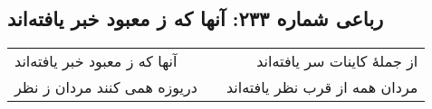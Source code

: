 \begin{center}
\section*{رباعی شماره ۲۳۳: آنها که ز معبود خبر یافته‌اند}
\label{sec:sh233}
\begin{longtable}{l p{0.5cm} r}
آنها که ز معبود خبر یافته‌اند
&&
از جملهٔ کاینات سر یافته‌اند
\\
دریوزه همی کنند مردان ز نظر
&&
مردان همه از قرب نظر یافته‌اند
\\
\end{longtable}
\end{center}
